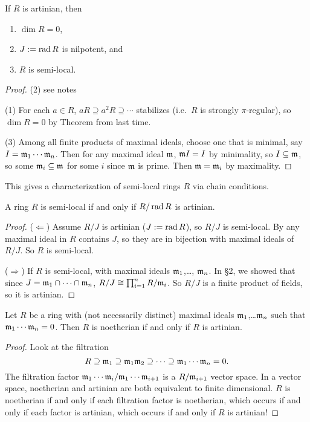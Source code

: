  \begin{proposition}
   If $R$ is artinian, then
   \begin{enumerate}
     \item $\dim R=0$,
     \item $J:=\operatorname{rad} R$ is nilpotent, and
     \item $R$ is semi-local.
   \end{enumerate}
 \end{proposition}
 \begin{proof}
   (2) see notes

   (1) For each $a\in R$, $aR\supseteq a^2R\supseteq \cdots$ stabilizes (i.e.\ $R$ is
   strongly $\pi$-regular), so $\dim R=0$ by Theorem from last time.

   (3) Among all finite products of maximal ideals, choose one that is minimal, say
   $I=\mathfrak{m}_1\cdots \mathfrak{m}_n$. Then for any maximal ideal $\mathfrak{m}$, $\mathfrak{m} I = I$ by minimality, so
   $I\subseteq \mathfrak{m}$, so some $\mathfrak{m}_i\subseteq \mathfrak{m}$ for some $i$ since $\mathfrak{m}$ is prime. Then
   $\mathfrak{m}=\mathfrak{m}_i$ by maximality.
 \end{proof}
 This gives a characterization of semi-local rings $R$ via chain conditions.
 \begin{corollary}
   A ring $R$ is semi-local if and only if $R/\operatorname{rad} R$ is artinian.
 \end{corollary}
 \begin{proof}
   ($\Leftarrow$) Assume $R/J$ is artinian ($J:=\operatorname{rad} R$), so $R/J$ is semi-local. By any
   maximal ideal in $R$ contains $J$, so they are in bijection with maximal ideals of
   $R/J$. So $R$ is semi-local.

   ($\Rightarrow$) If $R$ is semi-local, with maximal ideals $\mathfrak{m}_1$,\dots, $\mathfrak{m}_n$. In
   \S 2, we showed that since $J=\mathfrak{m}_1\cap \cdots \cap \mathfrak{m}_n$, $R/J \cong \prod_{i=1}^n
   R/\mathfrak{m}_i$. So $R/J$ is a finite product of fields, so it is artinian.
 \end{proof}
 \begin{lemma}
   Let $R$ be a ring with (not necessarily distinct) maximal ideals $\mathfrak{m}_1$,\dots $\mathfrak{m}_n$
   such that $\mathfrak{m}_1\cdots \mathfrak{m}_n=0$. Then $R$ is noetherian if and only if $R$ is artinian.
 \end{lemma}
 \begin{proof}
   Look at the filtration
   \[
    R\supseteq \mathfrak{m}_1 \supseteq \mathfrak{m}_1\mathfrak{m}_2 \supseteq \cdots \supseteq \mathfrak{m}_1\cdots\mathfrak{m}_n =0.
   \]
   The filtration factor $\mathfrak{m}_1\cdots \mathfrak{m}_i/\mathfrak{m}_1\cdots \mathfrak{m}_{i+1}$ is a $R/\mathfrak{m}_{i+1}$ vector
   space. In a vector space, noetherian and artinian are both equivalent to finite
   dimensional. $R$ is noetherian if and only if each filtration factor is noetherian,
   which occurs if and only if each factor is artinian, which occurs if and only if $R$
   is artinian!
 \end{proof}
